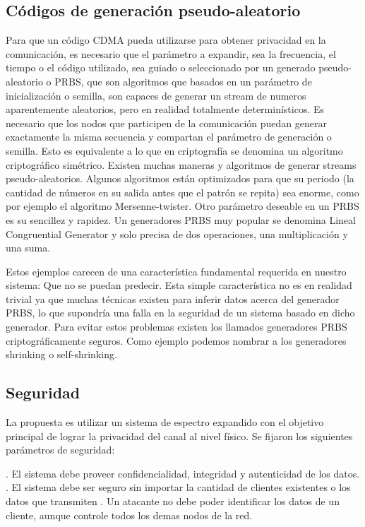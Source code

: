 \subsection{Códigos de generación pseudo-aleatorio}
Para que un código CDMA pueda utilizarse para obtener privacidad en la comunicación, es necesario que el parámetro a expandir, sea la frecuencia, el tiempo o el código utilizado, sea guiado o seleccionado por un generado pseudo-aleatorio o PRBS, que son algoritmos que basados en un parámetro de inicialización o semilla, son capaces de generar un stream de numeros aparentemente aleatorios, pero en realidad totalmente determinísticos. 
Es necesario que los nodos que participen de la comunicación puedan generar exactamente la misma secuencia y compartan el parámetro de generación o semilla. Esto es equivalente a lo que en criptografía se denomina un algoritmo criptográfico simétrico.
Existen muchas maneras y algoritmos de generar streams pseudo-aleatorios. Algunos algoritmos están optimizados para que su periodo (la cantidad de números en su salida antes que el patrón se repita) sea enorme, como por ejemplo el algoritmo Mersenne-twister.
Otro parámetro deseable en un PRBS es su sencillez y rapidez. Un generadores PRBS muy popular se denomina Lineal Congruential Generator y solo precisa de dos operaciones, una multiplicación y una suma.

Estos ejemplos carecen de una característica fundamental requerida en nuestro sistema: Que no se puedan predecir. Esta simple característica no es en realidad trivial ya que muchas técnicas existen para inferir datos acerca del generador PRBS, lo que supondría una falla en la seguridad de un sistema basado en dicho generador. Para evitar estos problemas existen los llamados generadores PRBS criptográficamente seguros. Como ejemplo podemos nombrar a los generadores shrinking o self-shrinking.

\subsection{Seguridad}
La propuesta es utilizar un sistema de espectro expandido con el objetivo principal de lograr la privacidad del canal al nivel físico.
Se fijaron los siguientes parámetros de seguridad:

. El sistema debe proveer confidencialidad, integridad y autenticidad de los datos.
. El sistema debe ser seguro sin importar la cantidad de clientes existentes o los datos que transmiten
. Un atacante no debe poder identificar los datos de un cliente, aunque controle todos los demas nodos de la red.

